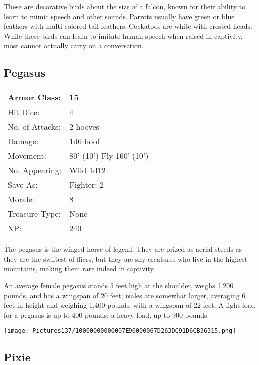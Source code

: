 \documentclass[a4paper,twoside,openany,10pt]{book}
\begin{document}
\begin{multicols}{2}
These are decorative birds about the size of a falcon, known for their ability to learn to mimic speech and other sounds. Parrots usually have green or blue feathers with multi-colored tail feathers. Cockatoos are white with crested heads. While these birds can learn to imitate human speech when raised in captivity, most cannot actually carry on a conversation.

\subsection*{Pegasus}\label{pegasus}

\begin{tabularx}{0.50\textwidth}{@{}lX@{}}
Armor Class: & 15 \\\hline
Hit Dice: & 4 \\\hline
No. of Attacks: & 2 hooves \\\hline
Damage: & 1d6 hoof \\\hline
Movement: & 80' (10') Fly
160' (10') \\\hline
No. Appearing: & Wild 1d12 \\\hline
Save As: & Fighter: 2 \\\hline
Morale: & 8 \\\hline
Treasure Type: & None \\\hline
XP: & 240 \\\hline
\end{tabularx}\medskip

The pegasus is the winged horse of legend. They are prized as aerial steeds as they are the swiftest of fliers, but they are shy creatures who live in the highest mountains, making them rare indeed in captivity. 

An average female pegasus stands 5 feet high at the shoulder, weighs 1,200 pounds, and has a wingspan of 20 feet; males are somewhat larger, averaging 6 feet in height and weighing 1,400 pounds, with a wingspan of 22 feet. A light load for a pegasus is up to 400 pounds; a heavy load, up to 900 pounds.

 \begin{center}
 	\texttt{[image: Pictures137/10000000000007E90000067D263DC91D6CB36315.png]} 
 \end{center}

\subsection*{Pixie}\label{pixie}


\end{multicols}
\end{document}
